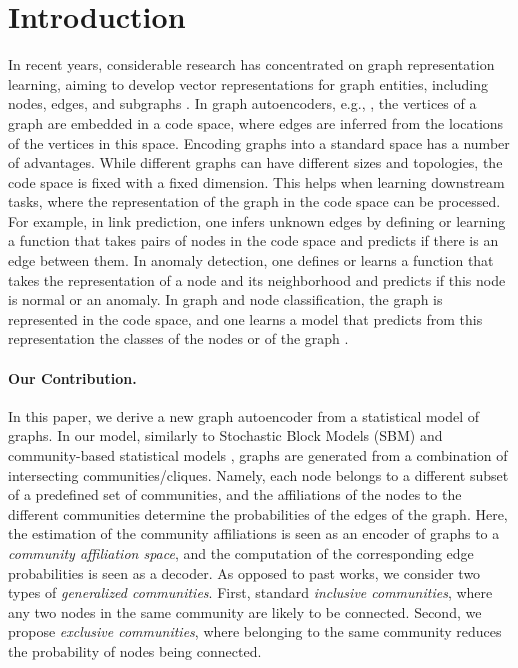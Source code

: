 \documentclass{article}
\theoremstyle{plain}
\theoremstyle{definition}
\theoremstyle{remark}
\newcommand{\ron}[1]{{{\textcolor{red}{\textbf{[Ron:} {#1}\textbf{]}}}}}
\begin{document}
\section{Introduction}

In recent years, considerable research has concentrated on graph representation learning, aiming to develop vector representations for graph entities, including nodes, edges, and subgraphs \cite{hamilton2017representation,GRL_survet2020}. In graph autoencoders, e.g.,  \cite{kipf2016variational,grover2019graphite,JMLR:v21:19-671,mehta2019stochastic}, the vertices of a graph are embedded in a code space, where edges are inferred from the locations of the vertices in this space. Encoding graphs into a standard space has a number of advantages. While different graphs can have different sizes and topologies, the code space is fixed with a fixed dimension. This helps when  learning downstream tasks, where the representation of the graph in the code space can be processed. For example, in link prediction, one infers unknown edges by defining \cite{kipf2016variational} or learning \cite{kumar2020linkreview} a function that takes pairs of nodes in the code space and predicts if there is an edge between them. In anomaly detection, one defines \cite{ding2019dominant,fan2020anomalydae} or learns \cite{chen2020gaan,ding2021aegis}  a function that takes the representation of a node and its neighborhood and predicts if this node is normal or an anomaly. In graph and node classification, the graph is represented in the code space, and one learns a model that predicts from this representation the classes of the nodes or of the graph \cite{GCN,MPNN}. %

\paragraph{Our Contribution.} In this paper, we derive a new graph autoencoder from a statistical model of graphs. In our model, similarly to Stochastic Block Models (SBM) \cite{nowicki2001estimation,lee2019review} and community-based statistical models  \cite{airoldi2008mixed,yang2013BigClam}, graphs are generated from a combination of intersecting communities/cliques. Namely, each node belongs to a different subset of a predefined set of communities, and the affiliations of the nodes to the different communities determine the probabilities of the edges of the graph. Here, the estimation of the community affiliations is seen as an encoder of graphs to a  \emph{community affiliation space}, and the computation of the corresponding edge probabilities is seen as a decoder. As opposed to past works, we consider two types of \emph{generalized communities}. First, standard \emph{inclusive communities}, where any two nodes in the same community are likely to be connected. Second, we propose \emph{exclusive communities}, where belonging to the same community reduces the probability of nodes being connected. 
\end{document}
